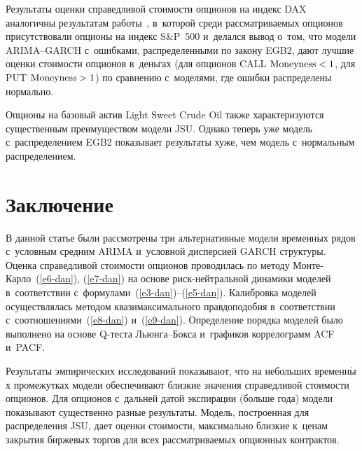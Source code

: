\begin{multicols}{2}

Результаты 
оценки спра\-вед\-ли\-вой стои\-мости опционов на индекс DAX аналогичны 
результатам работы~\cite{7-dan}, в~которой среди рас\-смат\-ри\-ва\-емых опционов 
присутствовали опционы на индекс S\&P~500 и~делался вывод о~том, что 
модели ARIMA--GARCH с~ошибками, распределенными по закону EGB2, дают 
лучшие оценки стоимости опционов в~деньгах (для опционов CALL 
$\mathrm{Moneyness}\hm< 1$, для PUT $\mathrm{Moneyness}\hm>1$) по сравнению с~моделями, 
где ошибки распределены нормально. 
  
  Опционы на базовый актив Light Sweet Crude Oil также характеризуются 
существенным преимуществом модели JSU. Однако теперь уже модель 
с~распределением EGB2 показывает результаты хуже, чем модель с~нормальным 
распределением.
  
\vspace*{-7pt}

\section{Заключение}
\vspace*{-2pt}

  В данной статье были рассмотрены три альтернативные модели временн$\acute{\mbox{ы}}$х 
рядов с~условным средним ARIMA и~условной дисперсией GARCH 
структуры. Оценка справедливой стоимости опционов проводилась по методу  
Мон\-те-Кар\-ло~(\ref{e6-dan}), (\ref{e7-dan}) на основе риск-ней\-т\-раль\-ной 
динамики моделей в~соответствии с~формулами~(\ref{e3-dan})--(\ref{e5-dan}). 
Калибровка моделей осуществлялась методом 
квазимаксимального правдоподобия в~соответствии 
с~соотношениями~(\ref{e8-dan}) и~(\ref{e9-dan}). Определение порядка моделей 
было выполнено на основе Q-тес\-та  
Льюн\-га--Бок\-са и~графиков коррелограмм ACF и~PACF. 
  
  Результаты эмпирических исследований показывают, что на небольших 
временн$\acute{\mbox{ы}}$х промежутках модели обеспечивают близкие значения 
справедливой стоимости опционов. Для опционов с~дальней датой 
экспирации (больше года) модели показывают существенно разные 
результаты. Модель, построенная для распределения JSU, дает 
оценки стоимости, максимально близкие к~ценам закрытия биржевых торгов 
для всех рас\-смат\-ри\-ва\-емых опционных контрактов. 
  
{\small\frenchspacing
 {%
 \begin{thebibliography}{99}
  

\end{thebibliography}}}
\end{multicols}
